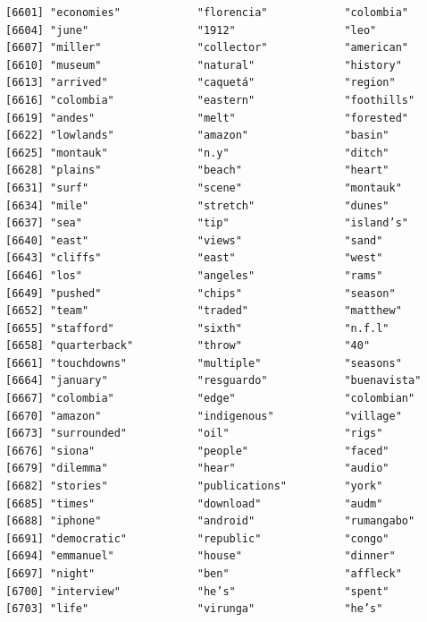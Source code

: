 \documentclass[
  letterpaper,
  DIV=11,
  numbers=noendperiod]{scrartcl}
\begin{document}
\begin{verbatim}
[6601] "economies"            "florencia"            "colombia"            
[6604] "june"                 "1912"                 "leo"                 
[6607] "miller"               "collector"            "american"            
[6610] "museum"               "natural"              "history"             
[6613] "arrived"              "caquetá"              "region"              
[6616] "colombia"             "eastern"              "foothills"           
[6619] "andes"                "melt"                 "forested"            
[6622] "lowlands"             "amazon"               "basin"               
[6625] "montauk"              "n.y"                  "ditch"               
[6628] "plains"               "beach"                "heart"               
[6631] "surf"                 "scene"                "montauk"             
[6634] "mile"                 "stretch"              "dunes"               
[6637] "sea"                  "tip"                  "island’s"            
[6640] "east"                 "views"                "sand"                
[6643] "cliffs"               "east"                 "west"                
[6646] "los"                  "angeles"              "rams"                
[6649] "pushed"               "chips"                "season"              
[6652] "team"                 "traded"               "matthew"             
[6655] "stafford"             "sixth"                "n.f.l"               
[6658] "quarterback"          "throw"                "40"                  
[6661] "touchdowns"           "multiple"             "seasons"             
[6664] "january"              "resguardo"            "buenavista"          
[6667] "colombia"             "edge"                 "colombian"           
[6670] "amazon"               "indigenous"           "village"             
[6673] "surrounded"           "oil"                  "rigs"                
[6676] "siona"                "people"               "faced"               
[6679] "dilemma"              "hear"                 "audio"               
[6682] "stories"              "publications"         "york"                
[6685] "times"                "download"             "audm"                
[6688] "iphone"               "android"              "rumangabo"           
[6691] "democratic"           "republic"             "congo"               
[6694] "emmanuel"             "house"                "dinner"              
[6697] "night"                "ben"                  "affleck"             
[6700] "interview"            "he’s"                 "spent"               
[6703] "life"                 "virunga"              "he’s"                

\end{verbatim}
\end{document}
